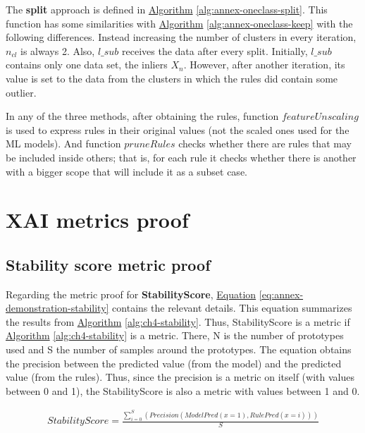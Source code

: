 The \textbf{split} approach is defined in \hyperref[alg:annex-oneclass-split]{Algorithm} \ref{alg:annex-oneclass-split}. This function has some similarities with \hyperref[alg:annex-oneclass-keep]{Algorithm} \ref{alg:annex-oneclass-keep} with the following differences. Instead increasing the number of clusters in every iteration, $n_{cl}$ is always 2. Also, $l\_sub$ receives the data after every split. Initially, $l\_sub$ contains only one data set, the inliers $X_n$. However, after another iteration, its value is set to the data from the clusters in which the rules did contain some outlier.

In any of the three methods, after obtaining the rules, function $featureUnscaling$ is used to express rules in their original values (not the scaled ones used for the ML models). And function $pruneRules$ checks whether there are rules that may be included inside others; that is, for each rule it checks whether there is another with a bigger scope that will include it as a subset case. 
    

\pagebreak
\section{XAI metrics proof}\label{sec:annex-demonstration-metrics}

\subsection{Stability score metric proof}\label{sec:annex-demonstration-metric-stability}
Regarding the metric proof for \textbf{StabilityScore}, \hyperref[eq:annex-demonstration-stability]{Equation} \ref{eq:annex-demonstration-stability} contains the relevant details. This equation summarizes the results from \hyperref[alg:ch4-stability]{Algorithm} \ref{alg:ch4-stability}. Thus, StabilityScore is a metric if \hyperref[alg:ch4-stability]{Algorithm} \ref{alg:ch4-stability} is a metric. There, N is the number of prototypes used and S the number of samples around the prototypes. The equation obtains the precision between the predicted value (from the model) and the predicted value (from the rules). Thus, since the precision is a metric on itself (with values between 0 and 1), the StabilityScore is also a metric with values between 1 and 0.

\begin{equation}\label{eq:annex-demonstration-stability}
\begin{split}
  StabilityScore = \frac{\sum_{i=0}^{S}(Precision(ModelPred(x=1), RulePred(x=i)))}{S}
\end{split}
\end{equation}

